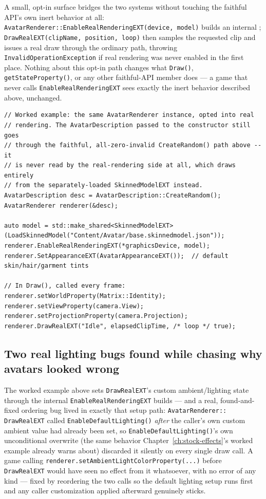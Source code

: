 A small, opt-in surface bridges the two systems without touching the faithful API's own
inert behavior at all: \texttt{AvatarRenderer::EnableRealRenderingEXT(device, model)} builds
an internal ; \texttt{DrawRealEXT(clipName, position, loop)} then
samples the requested clip and issues a real draw through the ordinary
 path, throwing \texttt{InvalidOperationException} if real rendering
was never enabled in the first place. Nothing about this opt-in path changes what
\texttt{Draw()}, \texttt{getStateProperty()}, or any other faithful-API member does --- a game
that never calls \texttt{EnableRealRenderingEXT} sees exactly the inert behavior described
above, unchanged.

\begin{lstlisting}
// Worked example: the same AvatarRenderer instance, opted into real
// rendering. The AvatarDescription passed to the constructor still goes
// through the faithful, all-zero-invalid CreateRandom() path above -- it
// is never read by the real-rendering side at all, which draws entirely
// from the separately-loaded SkinnedModelEXT instead.
AvatarDescription desc = AvatarDescription::CreateRandom();
AvatarRenderer renderer(&desc);

auto model = std::make_shared<SkinnedModelEXT>(LoadSkinnedModel("Content/Avatar/base.skinnedmodel.json"));
renderer.EnableRealRenderingEXT(*graphicsDevice, model);
renderer.SetAppearanceEXT(AvatarAppearanceEXT());  // default skin/hair/garment tints

// In Draw(), called every frame:
renderer.setWorldProperty(Matrix::Identity);
renderer.setViewProperty(camera.View);
renderer.setProjectionProperty(camera.Projection);
renderer.DrawRealEXT("Idle", elapsedClipTime, /* loop */ true);
\end{lstlisting}

\subsection{Two real lighting bugs found while chasing why avatars looked wrong}

The worked example above sets \texttt{DrawRealEXT}'s custom ambient/lighting state through the
internal  \texttt{EnableRealRenderingEXT} builds --- and a real,
found-and-fixed ordering bug lived in exactly that setup path: \texttt{AvatarRenderer::%
DrawRealEXT} called \texttt{EnableDefaultLighting()} \emph{after} the caller's own custom
ambient value had already been set, so \texttt{EnableDefaultLighting()}'s own unconditional
overwrite (the same behavior Chapter~\ref{ch:stock-effects}'s  worked example already warns
about) discarded it silently on every single draw call. A game calling
\texttt{renderer.setAmbientLightColorProperty(...)} before \texttt{DrawRealEXT} would have seen
no effect from it whatsoever, with no error of any kind --- fixed by reordering the two calls
so the default lighting setup runs first and any caller customization applied afterward
genuinely sticks.

